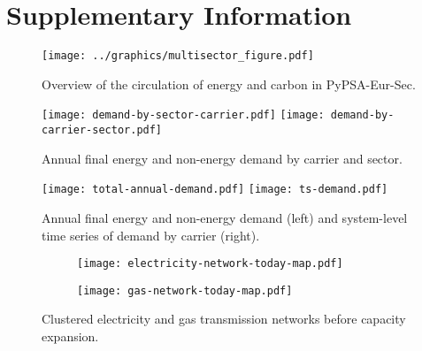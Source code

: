 
\section*{Supplementary Information}
\label{sec:si}
\normalsize

\begin{figure}[ht!]
    \centering
    \texttt{[image: ../graphics/multisector\_figure.pdf]}
    \caption{Overview of the circulation of energy and carbon in PyPSA-Eur-Sec.}
    \label{fig:multisector}
\end{figure}

\begin{figure}[ht!]
    \centering
    \texttt{[image: demand-by-sector-carrier.pdf]}
    \texttt{[image: demand-by-carrier-sector.pdf]}
    \caption{Annual final energy and non-energy demand by carrier and sector.}
    \label{fig:demand-by-sector-carrier}
\end{figure}

\begin{figure}[ht!]
    \centering
    \texttt{[image: total-annual-demand.pdf]}
    \texttt{[image: ts-demand.pdf]}
    \caption{Annual final energy and non-energy demand (left) and system-level time series of demand by carrier (right).}
    \label{fig:demand-time}
\end{figure}

\begin{figure}[ht!]
    \centering
\begin{subfigure}[t]{0.49\textwidth}
    \centering
    \texttt{[image: electricity-network-today-map.pdf]}
\end{subfigure}
\begin{subfigure}[t]{0.49\textwidth}
    \centering
    \texttt{[image: gas-network-today-map.pdf]}
\end{subfigure}
\caption{Clustered electricity and gas transmission networks before capacity expansion.}
\label{fig:clustered-networks}
\end{figure}



